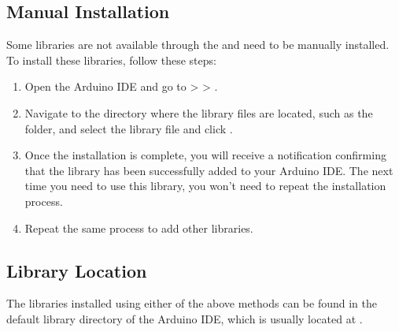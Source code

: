 \documentclass[a4paper,11pt,english]{sphinxmanual}
\begin{document}
\subsection{Manual Installation}
\label{\detokenize{Get_Started_with_Arduino/How_to_add_Libraries:manual-installation}}\label{\detokenize{Get_Started_with_Arduino/How_to_add_Libraries:manual-install-lib}}
\sphinxAtStartPar
Some libraries are not available through the  and need to be manually installed. To install these libraries, follow these steps:
\begin{enumerate}
%
\item {} 
\sphinxAtStartPar
Open the Arduino IDE and go to  \sphinxhyphen{}\textgreater{}  \sphinxhyphen{}\textgreater{} .

\noindent{}

\item {} 
\sphinxAtStartPar
Navigate to the directory where the library files are located, such as the  folder, and select the library file and click .

\noindent{}

\item {} 
\sphinxAtStartPar
Once the installation is complete, you will receive a notification confirming that the library has been successfully added to your Arduino IDE. The next time you need to use this library, you won’t need to repeat the installation process.

\noindent{}

\item {} 
\sphinxAtStartPar
Repeat the same process to add other libraries.

\end{enumerate}


\subsection{Library Location}
\label{\detokenize{Get_Started_with_Arduino/How_to_add_Libraries:library-location}}
\sphinxAtStartPar
The libraries installed using either of the above methods can be found in the default library directory of the Arduino IDE, which is usually located at .
\end{document}
